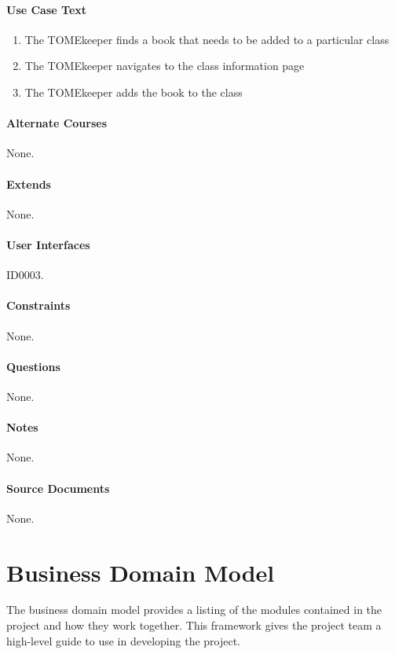 \documentclass[12pt,titlepage]{article}
\begin{document}
\paragraph{Use Case Text}
\begin{enumerate}
	\item The TOMEkeeper finds a book that needs to be added to a particular class
	\item The TOMEkeeper navigates to the class information page
	\item The TOMEkeeper adds the book to the class
\end{enumerate}
\paragraph{Alternate Courses}
None.
\paragraph{Extends}
None.
\paragraph{User Interfaces}
ID0003.
\paragraph{Constraints}
None.
\paragraph{Questions}
None.
\paragraph{Notes}
None.
\paragraph{Source Documents}
None.

\section{Business Domain Model}
The business domain model provides a listing of the modules contained in the project and how they work together.  This framework gives the project team a high-level guide to use in developing the project.
\end{document}
